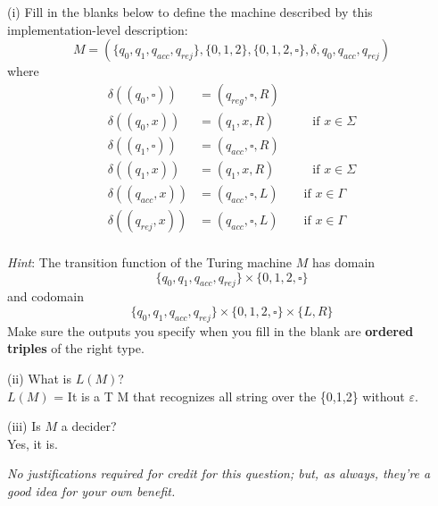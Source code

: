 \documentclass[10pt,letterpaper,unboxed,cm]{hmcpset}
\begin{document}
\begin{problem}[2.]
\begin{itemize}
(i) Fill in the blanks below to define the machine described by this implementation-level description:
\[
M = (\{q_0, q_1, q_{acc}, q_{rej}\}, \{0,1,2\}, \{0,1,2, \square\}, \delta, q_0, q_{acc}, q_{rej} )
\]
 where
\begin{align*}
\delta( (q_0, \square) ) &= (q_{reg}, \square, R ) \\
\delta ( (q_0 ,x) ) &= (q_{1}, x, R ) \qquad \quad \text    {if } x  \in \Sigma \\
\delta( (q_1, \square) ) &=  (q_{acc}, \square, R) \\
\delta ( (q_1 ,x) )    &= (q_{ 1 }, x, R )\qquad \quad \text{if } x  \in \Sigma \\
\delta( (q_{acc}, x) ) &= (q_{acc}, \square, L) \qquad \text{if } x \in \Gamma\\
\delta( (q_{rej}, x) ) &= (q_{acc}, \square, L) \qquad \text{if } x \in \Gamma\\
\end{align*}


{\it Hint}: The transition function of the Turing machine $M$ has domain 
\[
\{q_0, q_1, q_{acc}, q_{rej}\} \times \{0,1,2,\square\}
\]
and codomain 
\[
\{q_0, q_1, q_{acc}, q_{rej}\} \times \{0,1,2,\square\} \times \{L, R \}
\]
Make sure the outputs you specify when you fill in the blank are {\bf ordered triples} of the right type.


(ii) What is $L(M)$? \\
$L(M)$ = It is a T M that recognizes all string over the \{0,1,2\} without  $\varepsilon$.

(iii) Is $M$ a decider? \\
Yes, it is.


\end{itemize}

{\it No justifications required for credit for this question; but, as always, they're a good idea for your own benefit.}


\end{problem}
\end{document}
